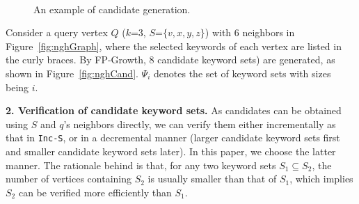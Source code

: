\begin{figure}[ht]
    \centering
    \mbox{
        \hspace{1ex}
    }
    \caption{An example of candidate generation.}
\end{figure}
\begin{example}
Consider a query vertex $Q$ ($k$=3, $S$=$\{v,x,y,z\}$) with 6 neighbors in Figure~\ref{fig:nghGraph},
where the selected keywords of each vertex are listed in the curly braces.
By FP-Growth, 8 candidate keyword sets) are generated, as shown in Figure~\ref{fig:nghCand}.
$\Psi_i$ denotes the set of keyword sets with sizes being $i$.
\end{example}

\textbf{2. Verification of candidate keyword sets.}
As candidates can be obtained using $S$ and $q$'s neighbors directly,
we can verify them either incrementally as that in {\tt Inc-S},
or in a decremental manner (larger candidate keyword sets first and smaller candidate keyword sets later).
In this paper, we choose the latter manner. The rationale behind is that,
for any two keyword sets $S_1\subseteq S_2$, the number of vertices containing $S_2$ is usually smaller than that of $S_1$,
which implies $S_2$ can be verified more efficiently than $S_1$.

